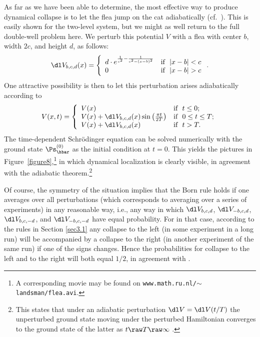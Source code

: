 \documentclass[12pt]{article}
\begin{document}
As far as we have been able to determine, the most effective way to produce dynamical collapse is to let the flea jump on the cat adiabatically (cf.\  \cite{Griffiths}). This is easily shown for the two-level system, but we might as well return to the full double-well problem here. We perturb this potential $V$ with a flea with 
center $b$, width $2c$, and height $d$, as follows:\begin{equation}
\dl V_ {b,c,d}(x)=\left\{\begin{array}{ll}
d\cdot e^{\frac{1}{c^2}-\frac{1}{c^2-(x-b)^2}}& \mbox{if \ } |x-b|<c\\
0 & \mbox{if \ } |x-b|>c
\end{array}\right. .
\end{equation}
One attractive possibility is then to let this perturbation arises adiabatically according to
\begin{equation}
V(x,t)=\left\{\begin{array}{ll}
V(x) & \mbox{if \ } t\leq 0;\\
V(x)+\dl V_{b,c,d}(x)\sin\left(\frac{\pi t}{2T}\right) & \mbox{if \ } 0\leq t\leq T;\\
V(x)+\dl V_{b,c,d}(x) & \mbox{if \ } t>T.
\end{array}\right. 
\label{RisingPot}
\end{equation}
The time-dependent Schr\"{o}dinger equation can be solved numerically with the ground state $\Ps_{\hbar}^{(0)}$ as the initial condition at $t=0$. This yields the pictures in Figure~\ref{figure8},\footnote{A corresponding movie may be found on \texttt{www.math.ru.nl/$\sim$landsman/flea.avi}.} in which dynamical localization is clearly visible, in agreement with the adiabatic theorem.\footnote{This states that
under an adiabatic perturbation $\dl V=\dl V(t/T)$ the unperturbed ground state moving under the perturbed Hamiltonian converges to the ground state of the latter as $t\raw T\raw\infty$ \cite{Griffiths,HJ}.}

Of course, the symmetry of the situation implies that the Born rule holds if one averages over all perturbations (which corresponds to averaging over a series of experiments) in any reasonable way, i.e.,
any way  in which $\dl V_{b,c,d}$, $\dl V_{-b,c,d}$, $\dl V_{b,c,-d}$, and $\dl V_{-b,c,-d}$ have equal probability. For in that case, according to the rules in Section \ref{sec3.1} any collapse to the left (in some experiment in a long run) will be accompanied by a collapse to the right (in another experiment of the same run) if one of the signs changes. Hence the probabilities for collapse to the left and to the right will both equal $1/2$, in agreement with .
\end{document}

